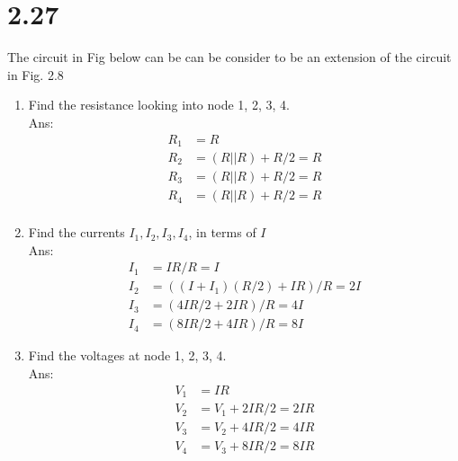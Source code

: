 \documentclass[12pt, a4paper]{article}
\begin{document}
\section{2.27}
The circuit in Fig below can be can be consider to be an extension of the circuit in Fig. 2.8


\begin{enumerate}[label=(\alph*)]
  \item Find the resistance looking into node 1, 2, 3, 4.\\
    Ans: 
    \begin{align*}
      R_1 &= R\\
      R_2 &= (R || R) + R / 2 = R\\
      R_3 &= (R || R) + R / 2 = R\\
      R_4 &= (R || R) + R / 2 = R\\
    \end{align*}
  \item Find the currents $I_1, I_2, I_3, I_4$, in terms of $I$\\
    Ans:
    \begin{align*}
      I_1 &= IR / R = I\\
      I_2 &= ((I+I_1) (R/2) + IR) / R= 2I\\
      I_3 &= (4IR/2 + 2IR)/R = 4I \\
      I_4 &= (8IR/2 + 4IR)/R = 8I 
    \end{align*}
  \item Find the voltages at node 1, 2, 3, 4.\\
    Ans:
    \begin{align*}
      V_1 &= IR               \\
      V_2 &= V_1 + 2IR/2 = 2IR\\
      V_3 &= V_2 + 4IR/2 = 4IR\\
      V_4 &= V_3 + 8IR/2 = 8IR
    \end{align*}
\end{enumerate}
\end{document}
